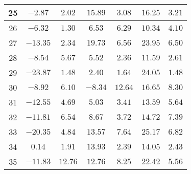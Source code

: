 \begin{table}[H]
\begin{tabular}{|c|c|c|c|c|c|c|}
                        25   &  $-2.87$    &  $2.02$   &  $15.89$   &  $3.08$  &  $16.25$ &  $3.21$   \\ \hline
                        26   &  $-6.32$    &  $1.30$   &  $6.53$    &  $6.29$  &  $10.34$ &  $4.10$   \\ \hline
                        27   &  $-13.35$   &  $2.34$   &  $19.73$   &  $6.56$  &  $23.95$ &  $6.50$   \\ \hline
                        28   &  $-8.54$    &  $5.67$   &  $5.52$    &  $2.36$  &  $11.59$ &  $2.61$   \\ \hline
                        29   &  $-23.87$   &  $1.48$   &  $2.40$    &  $1.64$  &  $24.05$ &  $1.48$   \\ \hline
                        30   &  $-8.92$    &  $6.10$   &  $-8.34$   &  $12.64$ &  $16.65$ &  $8.30$   \\ \hline
                        31   &  $-12.55$   &  $4.69$   &  $5.03$    &  $3.41$  &  $13.59$ &  $5.64$   \\ \hline
                        32   &  $-11.81$   &  $6.54$   &  $8.67$    &  $3.72$  &  $14.72$ &  $7.39$   \\ \hline
                        33   &  $-20.35$   &  $4.84$   &  $13.57$   &  $7.64$  &  $25.17$ &  $6.82$   \\ \hline
                        34   &  $0.14$     &  $1.91$   &  $13.93$   &  $2.39$  &  $14.05$ &  $2.43$   \\ \hline
                        35   &  $-11.83$   &  $12.76$  &  $12.76$   &  $8.25$  &  $22.42$ &  $5.56$   \\ \hline
        \end{tabular}
    \label{tab:media_fisica_6_aleatoria}
\end{table}

